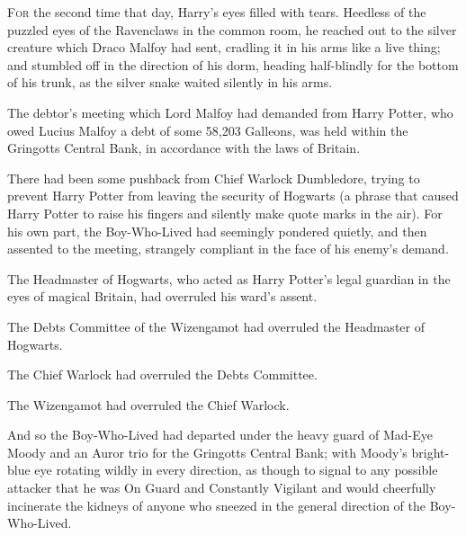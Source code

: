 
\lettrine{F}{or} the second time that day, Harry's eyes filled with tears. Heedless of the puzzled eyes of the Ravenclaws in the common room, he reached out to the silver creature which Draco Malfoy had sent, cradling it in his arms like a live thing; and stumbled off in the direction of his dorm, heading half-blindly for the bottom of his trunk, as the silver snake waited silently in his arms.


The debtor's meeting which Lord Malfoy had demanded from Harry Potter, who owed Lucius Malfoy a debt of some 58,203 Galleons, was held within the Gringotts Central Bank, in accordance with the laws of Britain.

There had been some pushback from Chief Warlock Dumbledore, trying to prevent Harry Potter from leaving the security of Hogwarts (a phrase that caused Harry Potter to raise his fingers and silently make quote marks in the air). For his own part, the Boy-Who-Lived had seemingly pondered quietly, and then assented to the meeting, strangely compliant in the face of his enemy's demand.

The Headmaster of Hogwarts, who acted as Harry Potter's legal guardian in the eyes of magical Britain, had overruled his ward's assent.

The Debts Committee of the Wizengamot had overruled the Headmaster of Hogwarts.

The Chief Warlock had overruled the Debts Committee.

The Wizengamot had overruled the Chief Warlock.

And so the Boy-Who-Lived had departed under the heavy guard of Mad-Eye Moody and an Auror trio for the Gringotts Central Bank; with Moody's bright-blue eye rotating wildly in every direction, as though to signal to any possible attacker that he was On Guard and Constantly Vigilant and would cheerfully incinerate the kidneys of anyone who sneezed in the general direction of the Boy-Who-Lived.

